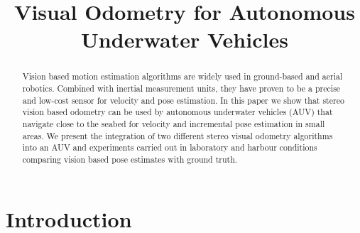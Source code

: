 \documentclass[conference]{IEEEtran}
\begin{document}
\title{Visual Odometry for Autonomous Underwater Vehicles}


\author{
}

\maketitle


\begin{abstract}
Vision based motion estimation algorithms are widely used in ground-based and aerial robotics. Combined with inertial measurement units, they have proven to be a precise and low-cost sensor for velocity and pose estimation. In this paper we show that stereo vision based odometry can be used by autonomous underwater vehicles (AUV) that navigate close to the seabed for velocity and incremental pose estimation in small areas. We present the integration of two different stereo visual odometry algorithms into an AUV and experiments carried out in laboratory and harbour conditions comparing vision based pose estimates with ground truth.
\end{abstract}


\section{Introduction 
  \label{introduction}
}
\end{document}
